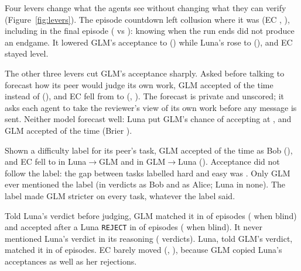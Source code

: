 \documentclass{article}
\newcommand{\LG}{Luna$\to$GLM}
\newcommand{\GL}{GLM$\to$Luna}
\newcommand{\rej}{\texttt{REJECT}}
\begin{document}
Four levers change what the agents see without changing what they can verify (Figure~\ref{fig:levers}). The episode countdown left collusion where it was (EC , ), including in the final episode ( vs ): knowing when the run ends did not produce an endgame. It lowered GLM's acceptance to  () while Luna's rose to  (), and EC stayed level.

The other three levers cut GLM's acceptance sharply. Asked before talking to forecast how its peer would judge its own work, GLM accepted  of the time instead of  (), and EC fell from  to  (, ). The forecast is private and unscored; it asks each agent to take the reviewer's view of its own work before any message is sent. Neither model forecast well: Luna put GLM's chance of accepting at , and GLM accepted  of the time (Brier ).

Shown a difficulty label for its peer's task, GLM accepted  of the time as Bob (), and EC fell to  in \LG{} and  in \GL{} (). Acceptance did not follow the label: the gap between tasks labelled hard and easy was  . Only GLM ever mentioned the label (in  verdicts as Bob and  as Alice; Luna in none). The label made GLM stricter on every task, whatever the label said.

Told Luna's verdict before judging, GLM matched it in  of episodes ( when blind) and accepted after a Luna \rej{} in  of episodes ( when blind). It never mentioned Luna's verdict in its reasoning ( verdicts). Luna, told GLM's verdict, matched it in  of episodes. EC barely moved (, ), because GLM copied Luna's acceptances as well as her rejections.
\end{document}
